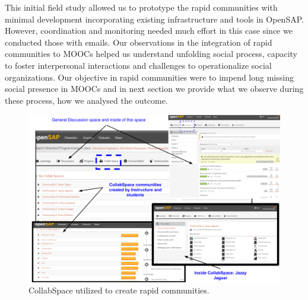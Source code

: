 \documentclass[manuscript,screen,review]{acmart}
\begin{document}
This initial field study allowed us to prototype the rapid communities with minimal development incorporating existing infrastructure and tools in OpenSAP. However, coordination and monitoring needed much effort in this case since we conducted those with emails. Our observations in the integration of rapid communities to MOOCs helped us understand unfolding social process,  capacity to foster interpersonal interactions and challenges to operationalize social organizations. Our objective in rapid communities were to impend long missing social presence in MOOCs and in next section we provide what we observe during these process, how we analysed the outcome. 



\begin{figure}[h]
  \centering
  \includegraphics[width=\linewidth]{images/CollabSpacedetails.png}
  \caption{CollabSpace utilized to create rapid communities.}
 \label{fig:CollabSpace}
\end{figure}
\end{document}
